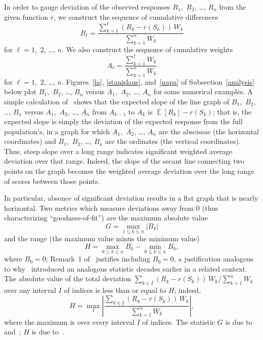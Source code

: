 \documentclass[12pt]{article}
\DeclareMathOperator{\E}{\mathop{}\mathbb{E}}
\begin{document}
In order to gauge deviation of the observed responses
$R_1$,~$R_2$, \dots, $R_n$ from the given function $r$,
we construct the sequence of cumulative differences
%
\begin{equation}
B_{\ell} = \frac{\sum_{k=1}^{\ell} (R_k - r(S_k)) \, W_k}{\sum_{k=1}^n W_k}
\end{equation}
%
for $\ell = 1$,~$2$, \dots, $n$.
We also construct the sequence of cumulative weights
%
\begin{equation}
A_{\ell} = \frac{\sum_{k=1}^{\ell} W_k}{\sum_{k=1}^n W_k}
\end{equation}
%
for $\ell = 1$,~$2$, \dots, $n$.
Figures~\ref{la}, \ref{stanislaus}, and~\ref{napa}
of Subsection~\ref{analysis} below plot $B_1$,~$B_2$, \dots, $B_n$
versus $A_1$,~$A_2$, \dots, $A_n$ for some numerical examples.
A simple calculation of~\citet{tygert_full} shows that the expected slope
of the line graph of $B_1$,~$B_2$, \dots, $B_n$ versus 
$A_1$,~$A_2$, \dots, $A_n$ from $A_{k-1}$ to $A_k$ is $\E[R_k] - r(S_k)$;
that is, the expected slope is simply the deviation of the expected response
from the full population's, in a graph for which $A_1$,~$A_2$, \dots, $A_n$
are the abscissae (the horizontal coordinates) and $B_1$,~$B_2$, \dots, $B_n$
are the ordinates (the vertical coordinates).
Thus, steep slope over a long range indicates
significant weighted average deviation over that range.
Indeed, the slope of the secant line connecting two points on the graph becomes
the weighted average deviation over the long range of scores
between those points.

In particular, absence of significant deviation results
in a flat graph that is nearly horizontal.
Two metrics which measure deviations away from 0
(thus characterizing ``goodness-of-fit'') are the maximum absolute value
%
\begin{equation}
\label{kolmogorov-smirnov}
G = \max_{1 \le k \le n} |B_k|
\end{equation}
%
and the range (the maximum value minus the minimum value)
%
\begin{equation}
\label{kuiper}
H = \max_{0 \le k \le n} B_k - \min_{0 \le k \le n} B_k,
\end{equation}
%
where $B_0 = 0$; Remark~1 of~\citet{tygert_full} justifies including $B_0 = 0$,
a justification analogous to why~\citet{kuiper} introduced
an analogous statistic decades earlier in a related context.
The absolute value of the total deviation
$\sum_{k \in I} (R_k - r(S_k)) \, W_k \Big/ \sum_{k=1}^n W_k$
over any interval $I$ of indices is less than or equal to $H$; indeed,
%
\begin{equation}
H = \max_I \left| \frac{\sum_{k \in I} (R_k - r(S_k)) \, W_k}
                       {\sum_{k=1}^n W_k} \right|,
\end{equation}
%
where the maximum is over every interval $I$ of indices.
The statistic $G$ is due to~\citet{kolmogorov} and~\citet{smirnov};
$H$ is due to~\citet{kuiper}.
\end{document}
